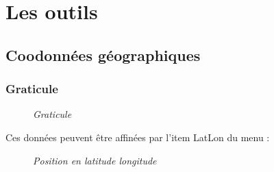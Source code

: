 \chapter{Les outils}
\section{Coodonnées géographiques}
\subsection{Graticule}
\begin{center}
\begin{figure}[ht]
\caption{\label{graticule}\textit{Graticule}}
\end{figure}
\end{center}
\newpage
Ces données peuvent être affinées par l'item LatLon du menu  :
\begin{center}
\begin{figure}[ht]
\caption{\label{graticule}\textit{Position en latitude longitude}}
\end{figure}
\end{center}
